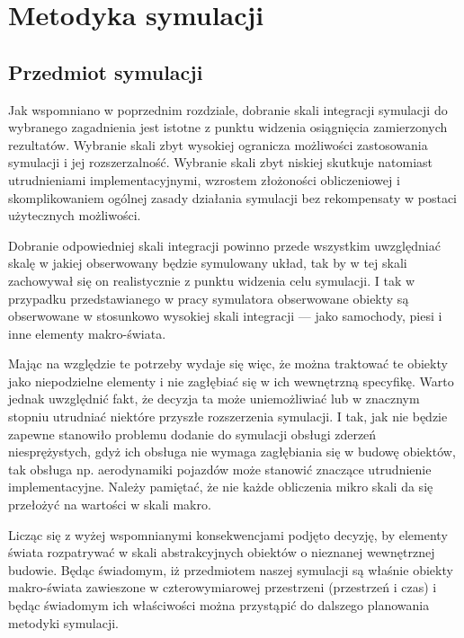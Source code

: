 \section[Metodyka symulacji][Metodyka symulacji]{Metodyka symulacji}
\subsection{Przedmiot symulacji}
\par{
Jak wspomniano w poprzednim rozdziale, dobranie skali integracji symulacji do wybranego zagadnienia jest istotne z punktu widzenia osiągnięcia zamierzonych rezultatów. Wybranie skali zbyt wysokiej ogranicza możliwości zastosowania symulacji i jej rozszerzalność. Wybranie skali zbyt niskiej skutkuje natomiast utrudnieniami implementacyjnymi, wzrostem złożoności obliczeniowej i skomplikowaniem ogólnej zasady działania symulacji bez rekompensaty w postaci użytecznych możliwości.
}
\par{
Dobranie odpowiedniej skali integracji powinno przede wszystkim uwzględniać skalę w jakiej obserwowany będzie symulowany układ, tak by w tej skali zachowywał się on realistycznie z punktu widzenia celu symulacji. I tak w przypadku przedstawianego w pracy symulatora obserwowane obiekty są obserwowane w stosunkowo wysokiej skali integracji --- jako samochody, piesi i inne elementy makro-świata.
}
\par{
Mając na względzie te potrzeby wydaje się więc, że można traktować te obiekty jako niepodzielne elementy i nie zagłębiać się w ich wewnętrzną specyfikę. Warto jednak uwzględnić fakt, że decyzja ta może uniemożliwiać lub w znacznym stopniu utrudniać niektóre przyszłe rozszerzenia symulacji. I tak, jak nie będzie zapewne stanowiło problemu dodanie do symulacji obsługi zderzeń niesprężystych, gdyż ich obsługa nie wymaga zagłębiania się w budowę obiektów, tak obsługa np. aerodynamiki pojazdów może stanowić znaczące utrudnienie implementacyjne. Należy pamiętać, że nie każde obliczenia mikro skali da się przełożyć na wartości w skali makro.
}
\par{
Licząc się z wyżej wspomnianymi konsekwencjami podjęto decyzję, by elementy świata rozpatrywać w skali abstrakcyjnych obiektów o nieznanej wewnętrznej budowie. Będąc świadomym, iż przedmiotem naszej symulacji są właśnie obiekty makro-świata zawieszone w czterowymiarowej przestrzeni (przestrzeń i czas) i będąc świadomym ich właściwości można przystąpić do dalszego planowania metodyki symulacji.
}

